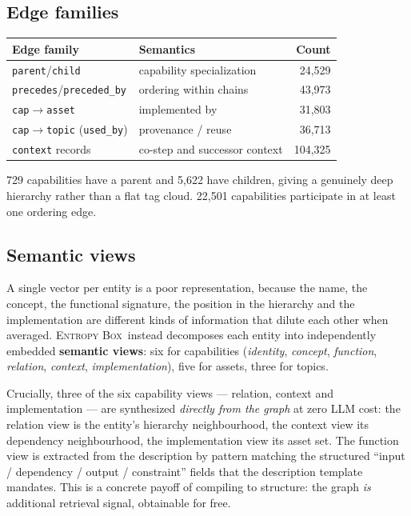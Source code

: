 \documentclass[10pt,a4paper]{article}
\newcommand{\eb}{\textsc{Entropy Box}\xspace}
\begin{document}
\subsection{Edge families}

\begin{center}
\small
\begin{tabular}{@{}llr@{}}
\toprule
Edge family & Semantics & Count \\
\midrule
\texttt{parent}/\texttt{child} & capability specialization & 24{,}529 \\
\texttt{precedes}/\texttt{preceded\_by} & ordering within chains & 43{,}973 \\
\texttt{cap}$\rightarrow$\texttt{asset} & implemented by & 31{,}803 \\
\texttt{cap}$\rightarrow$\texttt{topic} (\texttt{used\_by}) & provenance / reuse & 36{,}713 \\
\texttt{context} records & co-step and successor context & 104{,}325 \\
\bottomrule
\end{tabular}
\end{center}

729 capabilities have a parent and 5{,}622 have children, giving a
genuinely deep hierarchy rather than a flat tag cloud. 22{,}501 capabilities
participate in at least one ordering edge.

\subsection{Semantic views}
\label{sec:views}

A single vector per entity is a poor representation, because the name, the
concept, the functional signature, the position in the hierarchy and the
implementation are different kinds of information that dilute each other when
averaged. \eb\ instead decomposes each entity into independently embedded
\textbf{semantic views}: six for capabilities (\emph{identity}, \emph{concept},
\emph{function}, \emph{relation}, \emph{context}, \emph{implementation}), five
for assets, three for topics.

Crucially, three of the six capability views --- relation, context and
implementation --- are synthesized \emph{directly from the graph} at zero LLM
cost: the relation view is the entity's hierarchy neighbourhood, the context view
its dependency neighbourhood, the implementation view its asset set. The function
view is extracted from the description by pattern matching the structured
``input / dependency / output / constraint'' fields that the description template
mandates. This is a concrete payoff of compiling to structure: the graph
\emph{is} additional retrieval signal, obtainable for free.
\end{document}
